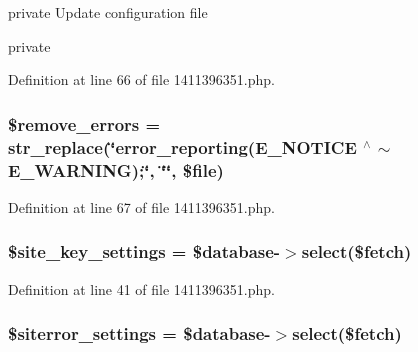 private Update configuration file

private 

Definition at line 66 of file 1411396351.\+php.

\subsubsection[{\texorpdfstring{\$remove\+\_\+errors}{$remove_errors}}]{\setlength{\rightskip}{0pt plus 5cm}\$remove\+\_\+errors = str\+\_\+replace(\char`\"{}error\+\_\+reporting(E\+\_\+\+N\+O\+T\+I\+CE $^\wedge$ $\sim$E\+\_\+\+W\+A\+R\+N\+I\+NG);\char`\"{}, \char`\"{}\char`\"{}, \$file)}\hypertarget{1411396351_8php_a7c532aa81eeffa35b8c2bb5c7648c85a}{}\label{1411396351_8php_a7c532aa81eeffa35b8c2bb5c7648c85a}


Definition at line 67 of file 1411396351.\+php.

\subsubsection[{\texorpdfstring{\$site\+\_\+key\+\_\+settings}{$site_key_settings}}]{\setlength{\rightskip}{0pt plus 5cm}\$site\+\_\+key\+\_\+settings = \${\bf database}-\/$>$select(\$fetch)}\hypertarget{1411396351_8php_ae846833ac05b1013eb18688f385be0f6}{}\label{1411396351_8php_ae846833ac05b1013eb18688f385be0f6}


Definition at line 41 of file 1411396351.\+php.

\subsubsection[{\texorpdfstring{\$siterror\+\_\+settings}{$siterror_settings}}]{\setlength{\rightskip}{0pt plus 5cm}\$siterror\+\_\+settings = \${\bf database}-\/$>$select(\$fetch)}\hypertarget{1411396351_8php_a603ec11d3d0b1de98b918ac7beaed8e9}{}\label{1411396351_8php_a603ec11d3d0b1de98b918ac7beaed8e9}


